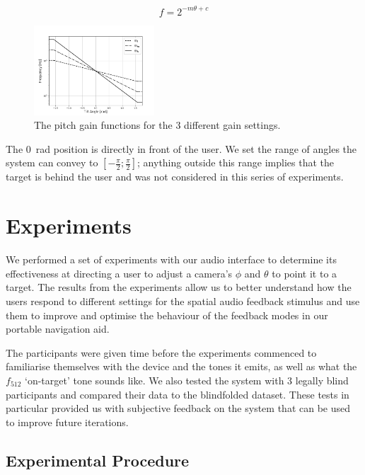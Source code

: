 \documentclass[sigconf, review=true, screen=true, anonymous=true]{acmart}
\begin{document}
\begin{equation}\label{eq:pitch-eq}
  f = 2^{-m \theta + c}
\end{equation}

\begin{figure}
  \centering
  \includegraphics[width=0.4\textwidth]{figures/pitch_gain_functions.png}
  \caption{The pitch gain functions for the 3 different gain settings. }\label{fig:pitch-gain}
\end{figure}

The \SI{0}{\radian} position is directly in front of the user.
We set the range of angles the system can convey to $[-\frac{\pi}{2}; \frac{\pi}{2}]$; anything outside this range implies that the target is behind the user and was not considered in this series of experiments. 

\section{Experiments}\label{sec:experiments}

We performed a set of experiments with our audio interface to determine its effectiveness at directing a user to adjust a camera's $\phi$ and $\theta$ to point it to a target.
The results from the experiments allow us to better understand how the users respond to different settings for the spatial audio feedback stimulus and use them to improve and optimise the behaviour of the feedback modes in our portable navigation aid.

The participants were given time before the experiments commenced to familiarise themselves with the device and the tones it emits, as well as what the $f_{512}$ `on-target' tone sounds like.
We also tested the system with 3 legally blind participants and compared their data to the blindfolded dataset.
These tests in particular provided us with subjective feedback on the system that can be used to improve future iterations.

\subsection{Experimental Procedure}
\end{document}
